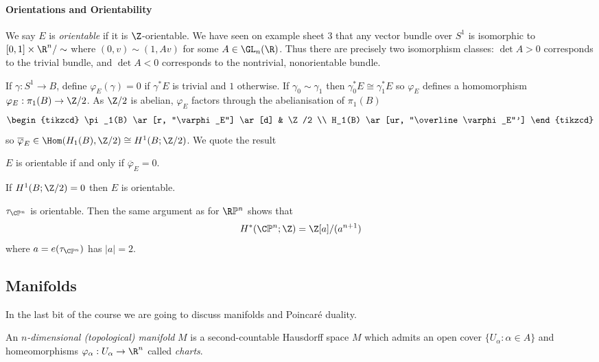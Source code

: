 \documentclass[a4paper]{article}
\renewcommand*{\P}{\mathbb{P}}
\begin{document}
\paragraph{Orientations and Orientability}

We say \(E\) is \emph{orientable} if it is \(\Z\)-orientable. We have seen on example sheet 3 that any vector bundle over \(S^1\) is isomorphic to \([0, 1] \times \R^n/\sim\) where \((0, v) \sim (1, A v)\) for some \(A \in \GL_n(\R)\). Thus there are precisely two isomorphism classes: \(\det A > 0\) corresponds to the trivial bundle, and \(\det A < 0\) corresponds to the nontrivial, nonorientable bundle.

If \(\gamma: S^1 \to B\), define \(\varphi_E(\gamma) = 0\) if \(\gamma^*E\) is trivial and \(1\) otherwise. If \(\gamma_0 \sim \gamma_1\) then \(\gamma_0^* E \cong \gamma_1^* E\) so \(\varphi_E\) defines a homomorphism \(\varphi_E: \pi_1(B) \to \Z/2\). As \(\Z/2\) is abelian, \(\varphi_E\) factors through the abelianisation of \(\pi_1(B)\)
\[
  \begin{tikzcd}
    \pi_1(B) \ar[r, "\varphi_E"] \ar[d] & \Z/2 \\
    H_1(B) \ar[ur, "\overline \varphi_E"']
  \end{tikzcd}
\]
so \(\overline \varphi_E \in \Hom(H_1(B), \Z/2) \cong H^1(B; \Z/2)\). We quote the result

\begin{theorem}
  \(E\) is orientable if and only if \(\overline \varphi_E = 0\).
\end{theorem}

\begin{corollary}
  If \(H^1(B; \Z/2) = 0\) then \(E\) is orientable.
\end{corollary}

\begin{eg}
  \(\tau_{\C\P^n}\) is orientable. Then the same argument as for \(\R\P^n\) shows that
  \[
    H^*(\C\P^n; \Z) = \Z[a]/(a^{n + 1})
  \]
  where \(a = e(\tau_{\C\P^n})\) has \(|a| = 2\).
\end{eg}

\subsection{Manifolds}

In the last bit of the course we are going to discuss manifolds and Poincaré duality.

\begin{definition}
  An \emph{\(n\)-dimensional (topological) manifold} \(M\) is a second-countable Hausdorff space \(M\) which admits an open cover \(\{U_\alpha: \alpha \in A\}\) and homeomorphisms \(\varphi_\alpha: U_\alpha \to \R^n\) called \emph{charts}.
\end{definition}
\end{document}
